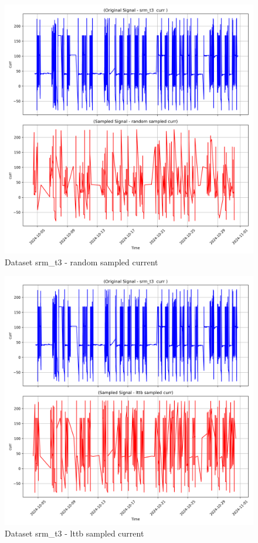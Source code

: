 \begin{figure}
    \centering
    \includegraphics[width=1\linewidth]{screenshots/srm_t3/random_sampled_curr_screenshot.png}
    \caption{Dataset srm\_t3 - random sampled current }
    \label{fig:srm_t3_random_sampled_curr_screenshot}
\end{figure}
\begin{figure}
    \centering
    \includegraphics[width=1\linewidth]{screenshots/srm_t3/lttb_sampled_curr_screenshot.png}
    \caption{Dataset srm\_t3 - lttb sampled current }
    \label{fig:srm_t3_lttb_sampled_curr_screenshot}
\end{figure}
